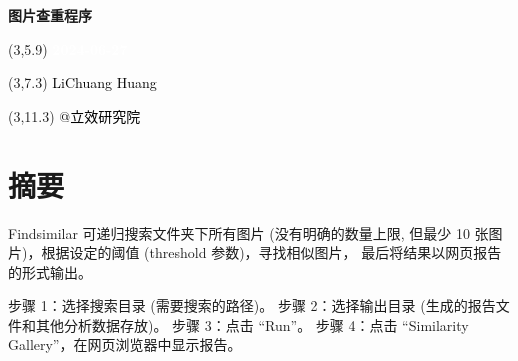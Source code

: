 \documentclass[
]{article}
\author{}
\date{\vspace{-2.5em}}
\begin{document}
\begin{titlepage} 
\begin{center} \textbf{\Huge 图片查重程序}
\vspace{4em} \begin{textblock}{10}(3,5.9) \huge
\textbf{\textcolor{white}{2024-06-27}}
\end{textblock} \begin{textblock}{10}(3,7.3)
\Large \textcolor{black}{LiChuang Huang}
\end{textblock} \begin{textblock}{10}(3,11.3)
\Large \textcolor{black}{@立效研究院}
\end{textblock} \end{center} \end{titlepage}
\restoregeometry


\begin{center}\vspace{1.5cm}\end{center}\tableofcontents

\begin{center}\vspace{1.5cm}\end{center}\listoffigures

\begin{center}\vspace{1.5cm}\end{center}\listoftables

\newpage


\hypertarget{abstract}{%
\section{摘要}\label{abstract}}

Findsimilar 可递归搜索文件夹下所有图片 (没有明确的数量上限, 但最少 10 张图片)，根据设定的阈值 (threshold 参数)，寻找相似图片，
最后将结果以网页报告的形式输出。

步骤 1：选择搜索目录 (需要搜索的路径)。
步骤 2：选择输出目录 (生成的报告文件和其他分析数据存放)。
步骤 3：点击 ``Run''。
步骤 4：点击 ``Similarity Gallery''，在网页浏览器中显示报告。
\end{document}
